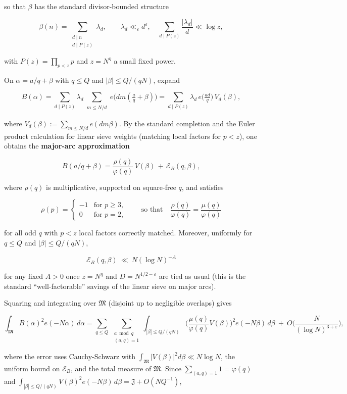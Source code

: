 \documentclass[11pt]{article}
\theoremstyle{definition}
\theoremstyle{remark}
\begin{document}
so that $\beta$ has the standard divisor-bounded structure

$$
	\beta(n)=\sum_{\substack{d\mid n\\ d\mid P(z)}}\lambda_d,\qquad
	\lambda_d\ll_\varepsilon d^\varepsilon,\quad \sum_{d\mid P(z)}\frac{|\lambda_d|}{d}\ll \log z,
$$

with $P(z)=\prod_{p<z}p$ and $z=N^{\eta}$ a small fixed power.

On $\alpha=a/q+\beta$ with $q\le Q$ and $|\beta|\le Q/(qN)$, expand

$$
	B(\alpha)=\sum_{d\mid P(z)}\lambda_d
	\sum_{\substack{m\le N/d}} e\!\big(dm(\tfrac aq+\beta)\big)
	=\sum_{d\mid P(z)}\lambda_d\, e\!\big(\tfrac{ad}{q}\big)\,V_d(\beta),
$$

where $V_d(\beta):=\sum_{m\le N/d}e(dm\beta)$. By the standard completion and the Euler product calculation for linear sieve weights (matching local factors for $p<z$), one obtains the \textbf{major-arc approximation}

$$
	B(a/q+\beta)=\frac{\rho(q)}{\varphi(q)}\,V(\beta)\,+\,\mathcal E_B(q,\beta),
$$

where $\rho(q)$ is multiplicative, supported on square-free $q$, and satisfies

$$
	\rho(p)=
	\begin{cases}
		-1 & \text{for } p\ge 3, \\
		0  & \text{for } p=2,
	\end{cases}
	\qquad\text{so that}\quad \frac{\rho(q)}{\varphi(q)}=\frac{\mu(q)}{\varphi(q)}
$$

for all odd $q$ with $p<z$ local factors correctly matched. Moreover, uniformly for $q\le Q$ and $|\beta|\le Q/(qN)$,

$$
	\mathcal E_B(q,\beta)\ \ll\ N(\log N)^{-A}
$$

for any fixed $A>0$ once $z=N^\eta$ and $D=N^{1/2-\varepsilon}$ are tied as usual (this is the standard “well-factorable” savings of the linear sieve on major arcs).

Squaring and integrating over $\mathfrak M$ (disjoint up to negligible overlaps) gives

$$
	\int_{\mathfrak M} B(\alpha)^2 e(-N\alpha)\,d\alpha
	= \sum_{q\le Q}\ \sum_{\substack{a\bmod q\\(a,q)=1}}
	\int_{|\beta|\le Q/(qN)}
	\Big(\frac{\mu(q)}{\varphi(q)}V(\beta)\Big)^{\!2} e(-N\beta)\,d\beta
	\ +\ O\!\Big(\frac{N}{(\log N)^{3+\varepsilon}}\Big),
$$

where the error uses Cauchy-Schwarz with $\int_{\mathfrak M}|V(\beta)|^2 d\beta\ll N\log N$, the uniform bound on $\mathcal E_B$, and the total measure of $\mathfrak M$.
Since $\sum_{(a,q)=1}1=\varphi(q)$ and $\int_{|\beta|\le Q/(qN)}V(\beta)^2 e(-N\beta)\,d\beta=\mathfrak J+O(NQ^{-1})$,
\end{document}
